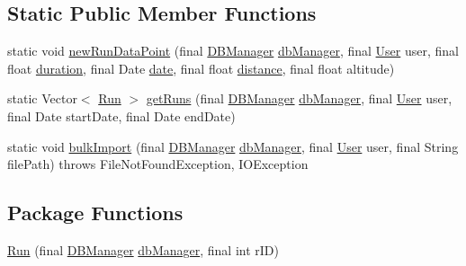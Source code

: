 \subsection*{Static Public Member Functions}
\begin{DoxyCompactItemize}
\item 
static void \mbox{\hyperlink{classcom_1_1activitytracker_1_1_run_a5dea6f1860431103d553ce770382afe0}{new\+Run\+Data\+Point}} (final \mbox{\hyperlink{classcom_1_1activitytracker_1_1_d_b_manager}{D\+B\+Manager}} \mbox{\hyperlink{classcom_1_1activitytracker_1_1_run_ab90e32eda9f4c671ae3575f971edca6b}{db\+Manager}}, final \mbox{\hyperlink{classcom_1_1activitytracker_1_1_user}{User}} user, final float \mbox{\hyperlink{classcom_1_1activitytracker_1_1_run_a5e38d293d29d4b65c9290ff4bee82e03}{duration}}, final Date \mbox{\hyperlink{classcom_1_1activitytracker_1_1_run_a66934b1f4fe6bc74a4e98574a2892764}{date}}, final float \mbox{\hyperlink{classcom_1_1activitytracker_1_1_run_a7b4ca8c4ecea4da1653f03b8c8fc16a8}{distance}}, final float altitude)
\item 
static Vector$<$ \mbox{\hyperlink{classcom_1_1activitytracker_1_1_run}{Run}} $>$ \mbox{\hyperlink{classcom_1_1activitytracker_1_1_run_a1aa1fb01eabff586e16d88f19f7df743}{get\+Runs}} (final \mbox{\hyperlink{classcom_1_1activitytracker_1_1_d_b_manager}{D\+B\+Manager}} \mbox{\hyperlink{classcom_1_1activitytracker_1_1_run_ab90e32eda9f4c671ae3575f971edca6b}{db\+Manager}}, final \mbox{\hyperlink{classcom_1_1activitytracker_1_1_user}{User}} user, final Date start\+Date, final Date end\+Date)
\item 
static void \mbox{\hyperlink{classcom_1_1activitytracker_1_1_run_a8e2b13e0096b87614d5333ec15213300}{bulk\+Import}} (final \mbox{\hyperlink{classcom_1_1activitytracker_1_1_d_b_manager}{D\+B\+Manager}} \mbox{\hyperlink{classcom_1_1activitytracker_1_1_run_ab90e32eda9f4c671ae3575f971edca6b}{db\+Manager}}, final \mbox{\hyperlink{classcom_1_1activitytracker_1_1_user}{User}} user, final String file\+Path)  throws File\+Not\+Found\+Exception, I\+O\+Exception 
\end{DoxyCompactItemize}
\subsection*{Package Functions}
\begin{DoxyCompactItemize}
\item 
\mbox{\hyperlink{classcom_1_1activitytracker_1_1_run_a5568c1c514835056d2abc22cfba222c5}{Run}} (final \mbox{\hyperlink{classcom_1_1activitytracker_1_1_d_b_manager}{D\+B\+Manager}} \mbox{\hyperlink{classcom_1_1activitytracker_1_1_run_ab90e32eda9f4c671ae3575f971edca6b}{db\+Manager}}, final int r\+ID)
\end{DoxyCompactItemize}
